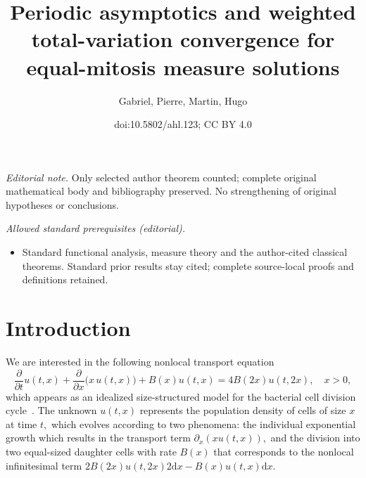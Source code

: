 \documentclass[10pt]{amsart}
\title{Periodic asymptotics and weighted total-variation convergence for equal-mitosis measure solutions}
\author{Gabriel, Pierre, Martin, Hugo}
\date{doi:10.5802/ahl.123; CC BY 4.0}
\theoremstyle{definition}\newtheorem{defi}[theo]{Definition}\newtheorem{rema}[theo]{Remark}\newtheorem{exam}[theo]{Example}\newtheorem{exem}[theo]{Example}\newtheorem{nota}[theo]{Notation}
\newcommand{\p}{\partial}
\newcommand{\ddt}{\frac{\p}{\p t}}
\newcommand{\ddx}{\frac{\p}{\p x}}
\newcommand{\1}{\mathds{1}}
\renewcommand{\d}{\mathrm{d}}
\begin{document}
\maketitle
\noindent\textit{Editorial note.} Only selected author theorem counted; complete original mathematical body and bibliography preserved. No strengthening of original hypotheses or conclusions.\par\medskip
\noindent\textit{Allowed standard prerequisites (editorial).}\begin{itemize}
\item Standard functional analysis, measure theory and the author-cited classical theorems. Standard prior results stay cited; complete source-local proofs and definitions retained.
\end{itemize}\medskip

\section{Introduction}

We are interested in the following nonlocal transport equation
\begin{equation}\label{eq:mitosis}
\ddt u(t,x) + \ddx \big(x\,u(t,x)\big) + B(x)u(t,x) = 4B(2x)u(t,2x),\quad x>0,
\end{equation}
which appears as an idealized size-structured model for the bacterial cell division cycle~\cite{BellAnderson,SinkoStreifer71}. The unknown $u(t,x)$ represents the population density of cells of size $x$ at time $t,$ which evolves according to two phenomena: the individual exponential growth which results in the transport term $\partial_x(xu(t,x)),$ and the division into two equal-sized daughter cells with rate $B(x)$ that corresponds to the nonlocal infinitesimal term $2B(2x)u(t,2x)2\d x-B(x)u(t,x)\d x$.
\end{document}
